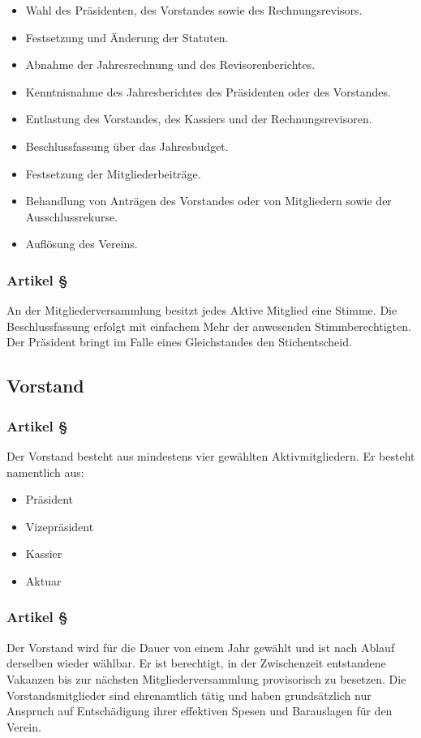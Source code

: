 \begin{itemize}
	\item Wahl des Präsidenten, des Vorstandes sowie des
		Rechnungsrevisors.
	\item Festsetzung und Änderung der Statuten.
	\item Abnahme der Jahresrechnung und des Revisorenberichtes.
	\item Kenntnisnahme des Jahresberichtes des Präsidenten oder des
		Vorstandes.
	\item Entlastung des Vorstandes, des Kassiers und der
		Rechnungsrevisoren.
	\item Beschlussfassung über das Jahresbudget.
	\item Festsetzung der Mitgliederbeiträge.
	\item Behandlung von Anträgen des Vorstandes oder von Mitgliedern
		sowie der Ausschlussrekurse.
	\item Auflösung des Vereins.
\end{itemize}

\subsubsection*{Artikel §\articlenumber}
An der Mitgliederversammlung besitzt jedes Aktive Mitglied eine Stimme. Die
Beschlussfassung erfolgt mit einfachem Mehr der anwesenden Stimmberechtigten. 
Der Präsident bringt im Falle eines Gleichstandes den Stichentscheid.

\subsection{Vorstand}

\subsubsection*{Artikel §\articlenumber}
Der Vorstand besteht aus mindestens vier gewählten Aktivmitgliedern.
Er besteht namentlich aus:

\begin{itemize}
	\item Präsident
	\item Vizepräsident
	\item Kassier
	\item Aktuar
\end{itemize}
 
\subsubsection*{Artikel §\articlenumber}
Der Vorstand wird für die Dauer von einem Jahr gewählt und ist nach Ablauf
derselben wieder wählbar.
Er ist berechtigt, in der Zwischenzeit entstandene Vakanzen bis zur nächsten
Mitgliederversammlung provisorisch zu besetzen. Die Vorstandsmitglieder sind
ehrenamtlich tätig und haben grundsätzlich nur Anspruch auf Entschädigung
ihrer effektiven Spesen und Barauslagen für den Verein.
